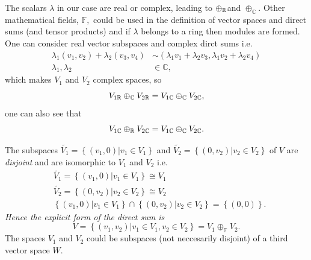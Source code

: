 \documentclass[aps,preprint]{revtex4}
\begin{document}
The scalars $\lambda$ in our case are real or complex, leading to $\oplus_{%
\mathbb{R}}$and $\oplus_{\mathbb{C}}.$ Other mathematical fields, $\mathbb{F}%
,$ could be used in the definition of vector spaces and direct sums (and
tensor products) and if $\lambda$ belongs to a ring then modules are formed.
One can consider real vector subspaces and complex dirct sums i.e. 
\begin{align}
\lambda_{1}\left( v_{1},v_{2}\right) +\lambda_{2}\left( v_{3},v_{4}\right) &
\sim\left( \lambda_{1}v_{1}+\lambda_{2}v_{3},\lambda_{1}v_{2}+\lambda
_{2}v_{4}\right) \\
\lambda_{1},\lambda_{2} & \in\mathbb{C},
\end{align}
which makes $V_{1}$ and $V_{2}$ complex spaces, so 
\begin{equation}
V_{1\mathbb{R}}\oplus_{\mathbb{C}}V_{2\mathbb{R}}=V_{1\mathbb{C}}\oplus_{%
\mathbb{C}}V_{2\mathbb{C}},
\end{equation}
one can also see that 
\begin{equation}
V_{1\mathbb{C}}\oplus_{\mathbb{R}}V_{2\mathbb{C}}=V_{1\mathbb{C}}\oplus_{%
\mathbb{C}}V_{2\mathbb{C}}.
\end{equation}

The subspaces $\widetilde{V_{1}}=\left\{ \left. \left( v_{1},0\right)
\right\vert v_{1}\in V_{1}\right\} $ and $\widetilde{V_{2}}=\left\{ \left.
\left( 0,v_{2}\right) \right\vert v_{2}\in V_{2}\right\} $ of $V$ are \emph{%
disjoint} and are isomorphic to $V_{1}$ and $V_{2}$ i.e. 
\begin{align}
& \widetilde{V_{1}}=\left\{ \left. \left( v_{1},0\right) \right\vert
v_{1}\in V_{1}\right\} \cong V_{1} \\
& \widetilde{V_{2}}=\left\{ \left. \left( 0,v_{2}\right) \right\vert
v_{2}\in V_{2}\right\} \cong V_{2} \\
& \left\{ \left. \left( v_{1},0\right) \right\vert v_{1}\in V_{1}\right\}
\cap\left\{ \left. \left( 0,v_{2}\right) \right\vert v_{2}\in V_{2}\right\}
=\left\{ \left( 0,0\right) \right\} .
\end{align}
\emph{Hence the explicit form of the direct sum is} 
\begin{equation}
V=\left\{ \left. \left( v_{1},v_{2}\right) \right\vert v_{1}\in
V_{1},v_{2}\in V_{2}\right\} =V_{1}\oplus_{\mathbb{F}}V_{2}.
\end{equation}
The spaces $V_{1}$ and $V_{2}$ could be subspaces (not neccesarily disjoint)
of a third vector space $W.$
\end{document}
